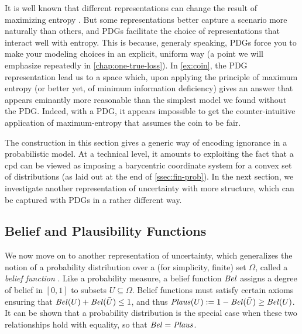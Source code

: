 It is well known that different representations can change the result of maximizing entropy \citep{seidenfeld1986entropy,critique-maxent,friedman1971jaynes}. 
But some representations better capture a scenario more naturally than others, and PDGs 
facilitate the choice of representations that interact well with entropy. 
This is because, generaly speaking, PDGs force you to make your modeling choices in an explicit, uniform way (a point we will emphasize repeatedly in \cref{chap:one-true-loss}).
In \cref{ex:coin}, the PDG representation lead us to a space which, upon applying the principle of maximum entropy (or better yet, of minimum information deficiency) gives an answer that appears eminantly more reasonable than the simplest model we found without the PDG. 
Indeed, with a PDG, it appears impossible to get the counter-intuitive
application of maximum-entropy that assumes the coin to be fair.

The construction in this section gives a generic way of 
    encoding ignorance in a probabilistic model. 
At a technical level, it amounts to exploiting the fact that a cpd can be viewed as imposing a barycentric coordinate system for a convex set of distributions (as laid out at the end of \cref{ssec:fin-prob}).
In the next section, we investigate another representation of uncertainty with more structure, which can be captured with PDGs in a rather different way.


\subsection{Belief and Plausibility Functions}
    \label{ssec:belplaus-as-pdg}
    
We now move on to another representation of uncertainty, which generalizes the notion of a probability distribution over a (for simplicity, finite) set $\Omega$, called a \emph{belief function} \citep{shafer1976mathematical}. 
Like a probability measure,
a belief function $\mathit{Bel}$ assigns a degree of belief in $[0,1]$ to subsets $U \subseteq \Omega$.  
Belief functions must satisfy certain axioms ensuring that $\mathit{Bel}(U) + \mathit{Bel}(\bar U) \le 1$, and thus $\mathit{Plaus}(U) := 1 - \mathit{Bel}(\bar U) \ge \mathit{Bel}(U)$. 
It can be shown that a probability distribution is the special case when these two relationships hold with equality, so that $\mathit{Bel} = \mathit{Plaus}$.  

